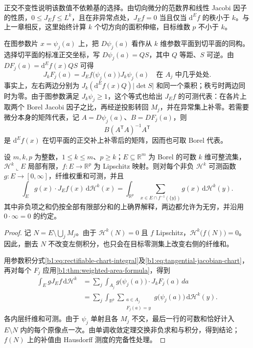 正交不变性说明该数值不依赖基的选择。由切向微分的范数界和线性 Jacobi 因子的性质，\(0\leq J_Ef\leq L^k\)，且在非异常点处，\(J_Ef=0\) 当且仅当 \(\mathrm{d}^Ef\) 的秩小于 \(k\)。与上一章相反，这里始终计算 \(k\) 个切方向的面积伸缩，目标维数 \(p\) 不小于 \(k\)。

\ProseParagraphBreak

在图参数片 \(x=\psi_j(a)\) 上，把 \(D\psi_j(a)\) 看作从 \(k\) 维参数平面到切平面的同构。选择切平面的标准正交坐标，写 \(D\psi_j(a)=QS\)，其中 \(Q\) 等距、\(S\) 可逆。由 \(DF_j(a)=\mathrm{d}^Ef(x)QS\) 可得
\begin{equation}
\label{b1:eq:tangential-jacobian-chart}
 J_kF_j(a)=J_Ef\bigl(\psi_j(a)\bigr)J_k\psi_j(a)
 \quad\text{在 }A_j\text{ 中几乎处处}.
\end{equation}
事实上，左右两边分别为 \(J_k(\mathrm{d}^Ef(x)Q)|\det S|\) 和同一个乘积；秩亏时两边同时为零。由于图参数满足 \(J_k\psi_j\geq1\)，这个等式也给出 \(J_Ef\) 的可测代表：在各片上取两个 Borel Jacobi 因子之比，再经逆投影转回 \(M_j\)，并在异常集上补零。若需要微分本身的矩阵代表，记 \(A=D\psi_j(a)\)、\(B=DF_j(a)\)，则
\[
 B(A^{\mathsf T}A)^{-1}A^{\mathsf T}
\]
是 \(\mathrm{d}^Ef(x)\) 在切平面的正交补上补零后的矩阵，因而也可取 Borel 代表。

\begin{theorem}[可整流集上的加权面积公式]
\label{b1:thm:rectifiable-area-formula}
设 \(m,k,p\) 为整数，\(1\leq k\leq m\)、\(p\geq k\)；\(E\subseteq\mathbb R^m\) 为 Borel 的可数 \(k\) 维可整流集，\(\mathcal H^k\llcorner E\) 局部有限，\(f:E\to\mathbb R^p\) 为 Lipschitz 映射。则对每个非负 \(\mathcal H^k\) 可测函数 \(g:E\rightarrow[0,\infty]\)，纤维权重和可测，并且
\[
 \int_E g(x)\cdot J_Ef(x)\,\mathrm{d}\mathcal H^k(x)
 =\int_{\mathbb R^p}
   \sum_{x\in E\cap f^{-1}(\{y\})}g(x)\,\mathrm{d}\mathcal H^k(y).
\]
其中非负项之和仍按全部有限部分和的上确界解释，两边都允许为无穷，并沿用 \(0\cdot\infty=0\) 的约定。
\end{theorem}
\begin{proof}
记 \(N=E\setminus\bigcup_jM_j\)。由于 \(\mathcal H^k(N)=0\) 且 \(f\) Lipschitz，\(\mathcal H^k\bigl(f(N)\bigr)=0\)。因此，删去 \(N\) 不改变左侧积分，也只会在目标零测集上改变右侧的纤维和。

用参数积分式\eqref{b1:eq:rectifiable-chart-integral}及\eqref{b1:eq:tangential-jacobian-chart}，再对每个 \(F_j\) 应用\cref{b1:thm:weighted-area-formula}，得到
\[
 \begin{aligned}
 \int_EgJ_Ef\,\mathrm{d}\mathcal H^k
 &=\sum_j\int_{A_j}g\bigl(\psi_j(a)\bigr)\cdot J_kF_j(a)\,da\\
 &=\sum_j\int_{\mathbb R^p}
       \sum_{\substack{a\in A_j\\F_j(a)=y}}
       g\bigl(\psi_j(a)\bigr)\,\mathrm{d}\mathcal H^k(y).
 \end{aligned}
\]
各内层纤维和可测。由于 \(\psi_j\) 单射且各 \(M_j\) 不交，最后一行的可数和恰好计入 \(E\setminus N\) 内的每个原像点一次。由单调收敛定理交换非负求和与积分，得到结论；\(f(N)\) 上的补值由 Hausdorff 测度的完备性处理。
\end{proof}

